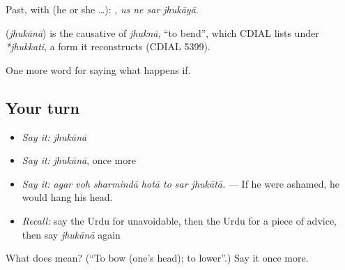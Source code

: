 Past, with  (he or she …):    , \emph{us ne sar jhukāyā}.

\begin{cousinweb}
\textbf{} (\emph{jhukānā}) is the causative of \emph{jhuknā}, \textquotedblleft{}to bend\textquotedblright{}, which CDIAL lists under \emph{*jhukkati}, a form it reconstructs (CDIAL 5399).
\end{cousinweb}

\begin{grammarlens}[title={What you've built}]
One more word for saying what happens if.
\end{grammarlens}

\subsection*{Your turn}
\begin{itemize}
\raggedright
  \item \emph{Say it:} \emph{jhukānā}
  \item \emph{Say it:} \emph{jhukānā}, once more
  \item \emph{Say it:} \emph{agar voh sharmindā hotā to sar jhukātā.} — If he were ashamed, he would hang his head.
  \item \emph{Recall:} say the Urdu for unavoidable, then the Urdu for a piece of advice, then say \emph{jhukānā} again
\end{itemize}

\begin{tcolorbox}[breakable,colback=teal!4,colframe=teal!35!black,title={Before you move on}]
What does  mean? (\textquotedblleft{}To bow (one's head); to lower\textquotedblright{}.) Say it once more.
\end{tcolorbox}
